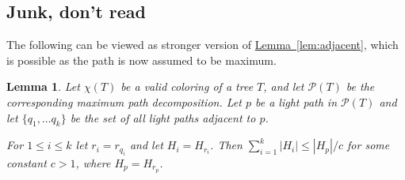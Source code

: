 \documentclass[11pt]{article}
\newtheorem{lemma}[theorem]{Lemma}
\theoremstyle{definition}
\newcommand{\Lem}[1]{\hyperref[lem:#1]{Lemma~\ref*{lem:#1}}} %
\begin{document}

\subsection{Junk, don't read}
The following can be viewed as stronger version of \Lem{adjacent}, which is possible as the path is now assumed to be maximum.

\begin{lemma}
 Let $\chi(T)$ be a valid coloring of a tree $T$, and let $\mathcal{P}(T)$ be the corresponding maximum path decomposition.
 Let $p$ be a light path in $\mathcal{P}(T)$ and let $\{q_1, \dots q_k\}$ be the set of all light paths adjacent to $p$.
 
 For $1\leq i\leq k$ let $r_i = r_{q_i}$ and let $H_i = H_{r_i}$.
  Then $\sum_{i=1}^k |H_i| \leq |H_p|/c$ for some constant $c>1$, where $H_p = H_{r_p}$.
\end{lemma}


% 









\end{document}

